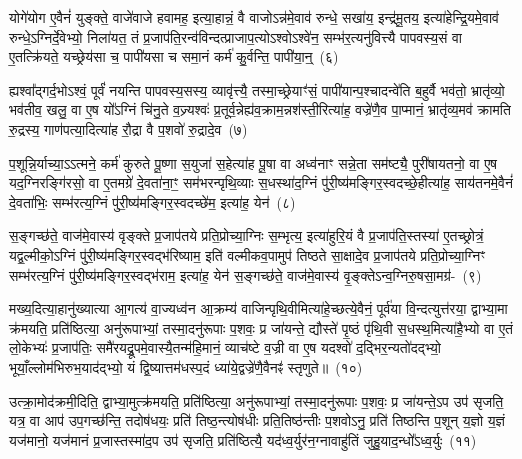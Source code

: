 योगे॑योग ए॒वैनं॑ युङ्क्ते॒ वाजे॑वाजे हवामह॒ इत्या॒हान्नं॒ वै वाजो\-ऽन्न॑मे॒वाव॑ रुन्धे॒ सखा॑य॒ इन्द्र॑मू॒तय॒ इत्या॑हेन्द्रि॒यमे॒वाव॑ रुन्धे॒\-ऽग्निर्दे॒वेभ्यो॒ निला॑यत॒ तं प्र॒जा\-प॑ति॒रन्व॑विन्दत्प्राजाप॒त्यो\-ऽश्वो\-ऽश्वे॑न॒ सम्भ॑र॒त्यनु॑वित्त्यै पापवस्य॒सं वा ए॒तत्क्रि॑यते॒ यच्छ्रेय॑सा च॒ पापी॑यसा च समा॒नं कर्म॑ कु॒र्वन्ति॒ पापी॑या॒न्॒~(६)\ip

ह्यश्वा᳚द्गर्द॒भो\-ऽश्वं॒ पूर्वं॑ नयन्ति पापवस्य॒सस्य॒ व्यावृ॑त्त्यै॒ तस्मा॒च्छ्रेयाꣳ॑सं॒ पापी॑यान्प॒श्चा\-दन्वे॑ति ब॒हुर्वै भव॑तो॒ भ्रातृ॑व्यो॒ भव॑तीव॒ खलु॒ वा ए॒ष यो᳚\-ऽग्निं चि॑नु॒ते व॒ज्र्यश्वः॑ प्र॒तूर्व॒न्नेह्य॑व॒\-क्राम॒न्नश॑स्ती॒रित्या॑ह॒ वज्रे॑णै॒व पा॒प्मानं॒ भ्रातृ॑व्य॒मव॑ क्रामति रु॒द्रस्य॒ गाण॑पत्या॒दित्या॑ह रौ॒द्रा वै प॒शवो॑ रु॒द्रादे॒व~(७)\ip

प॒शून्नि॒र्याच्या॒\-ऽऽ\-त्मने॒ कर्म॑ कुरुते पू॒ष्णा स॒युजा॑ स॒हेत्या॑ह पू॒षा वा अध्व॑नाꣳ सन्ने॒ता सम॑ष्ट्यै॒ पुरी॑षायतनो॒ वा ए॒ष यद॒ग्निरङ्गि॑रसो॒ वा ए॒तमग्रे॑ दे॒वता॑ना॒ꣳ॒ सम॑भरन्पृथि॒व्याः स॒धस्था॑द॒ग्निं पु॑री॒ष्य॑मङ्गिर॒\-स्वदच्छे॒हीत्या॑ह॒ साय॑तनमे॒वैनं॑ दे॒वता॑भिः॒ सम्भ॑रत्य॒ग्निं पु॑री॒ष्य॑मङ्गिर॒\-स्वदच्छे॑म॒ इत्या॑ह॒ येन॑~(८)\ip

स॒ङ्गच्छ॑ते॒ वाज॑मे॒वास्य॑ वृङ्क्ते प्र॒जा\-प॑तये प्रति॒प्रोच्या॒ग्निः स॒म्भृत्य॒ इत्या॑हुरि॒यं वै प्र॒जा\-प॑ति॒स्तस्या॑ ए॒तच्छ्रोत्रं॒ यद्व॒ल्मीको॒\-ऽग्निं पु॑री॒ष्य॑मङ्गिर॒\-स्वद्भ॑रिष्याम॒ इति॑ वल्मीकव॒पामुप॑ तिष्ठते सा॒क्षादे॒व प्र॒जा\-प॑तये प्रति॒प्रोच्या॒ग्निꣳ सम्भ॑रत्य॒ग्निं पु॑री॒ष्य॑मङ्गिर॒\-स्वद्भ॑राम॒ इत्या॑ह॒ येन॑ स॒ङ्गच्छ॑ते॒ वाज॑मे॒वास्य॑ वृ॒ङ्क्ते\-ऽन्व॒ग्निरु॒षसा॒मग्र॑-~(९)\ip

मख्य॒दित्या॒हानु॑ख्यात्या आ॒गत्य॑ वा॒ज्यध्व॑न आ॒क्रम्य॑ वाजिन्पृथि॒वीमित्या॑हे॒च्छत्ये॒वैनं॒ पूर्व॑या वि॒न्दत्युत्त॑रया॒ द्वाभ्या॒मा क्र॑मयति॒ प्रति॑ष्ठित्या॒ अनु॑रूपाभ्यां॒ तस्मा॒दनु॑रूपाः प॒शवः॒ प्र जा॑यन्ते॒ द्यौस्ते॑ पृ॒ष्ठं पृ॑थि॒वी स॒धस्थ॒मित्या॑है॒भ्यो वा ए॒तं लो॒केभ्यः॑ प्र॒जा\-प॑तिः॒ समै॑रयद्रू॒पमे॒वास्यै॒तन्म॑हि॒मानं॒ व्याच॑ष्टे व॒ज्री वा ए॒ष यदश्वो॑ द॒द्भिर॒न्यतो॑दद्भ्यो॒ भूयाँ॒ल्लोम॑भिरुभ॒याद॑द्भ्यो॒ यं द्वि॒ष्यात्तम॑धस्प॒दं ध्या॑ये॒द्वज्रे॑णै॒वैनꣴ॑ स्तृणुते॥~(१०)\ip

{\anuvakamend[{आ॒ह॒ पापी॑यान्रु॒द्रादे॒व येनाग्रं॑ व॒ज्री वै स॒प्तद॑श च}]}

उत्क्रा॒मोद॑क्रमी॒दिति॒ द्वाभ्या॒मुत्क्र॑मयति॒ प्रति॑ष्ठित्या॒ अनु॑रूपाभ्यां॒ तस्मा॒दनु॑रूपाः प॒शवः॒ प्र जा॑यन्ते॒\-ऽप उप॑ सृजति॒ यत्र॒ वा आप॑ उप॒गच्छ॑न्ति॒ तदोष॑धयः॒ प्रति॑ तिष्ठ॒न्त्योष॑धीः प्रति॒तिष्ठ॑न्तीः प॒शवो\-ऽनु॒ प्रति॑ तिष्ठन्ति प॒शून् य॒ज्ञो य॒ज्ञं यज॑मानो॒ यज॑मानं प्र॒जास्तस्मा॑द॒प उप॑ सृजति॒ प्रति॑ष्ठित्यै॒ यद॑ध्व॒र्युर॑न॒ग्नावाहु॑तिं जुहु॒याद॒न्धो᳚\-ऽध्व॒र्युः~(११)\ip


